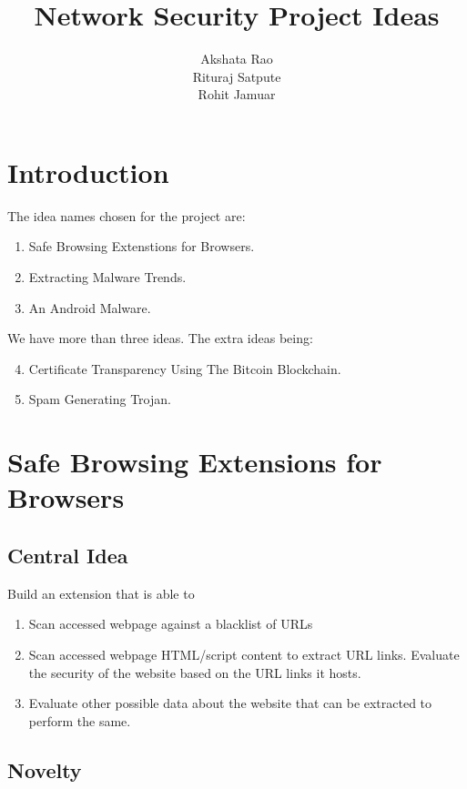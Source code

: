 \documentclass[a4paper]{article}
\title{Network Security Project Ideas}
\author{Akshata Rao \\ Rituraj Satpute \\ Rohit Jamuar}
\begin{document}
\maketitle

\section*{Introduction}

The idea names chosen for the project are:
\begin{enumerate}
\item Safe Browsing Extenstions for Browsers.
\item Extracting Malware Trends.
\item An Android Malware.
\end{enumerate}


We have more than three ideas. The extra ideas being:
\begin{enumerate}
\setcounter{enumi}{3}
\item Certificate Transparency Using The Bitcoin Blockchain.
\item Spam Generating Trojan.
\end{enumerate}

\section{Safe Browsing Extensions for Browsers}
\label{sec:i1}

\subsection{Central Idea}
Build an extension that is able to 
\begin{enumerate}
\item Scan accessed webpage against a blacklist of URLs

\item Scan accessed webpage HTML/script content to extract URL links. Evaluate the security of the website based on the URL links it hosts.

\item Evaluate other possible data about the website that can be extracted to perform the same.

\end{enumerate}

\subsection{Novelty}
\end{document}
